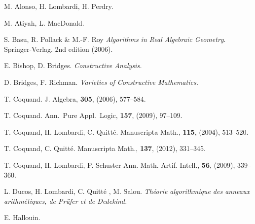 \documentclass[11pt,a4paper,twoside]{article}
\begin{document}
\begin{thebibliography}{50}

{\sc M. Alonso, H. Lombardi, H. Perdry}.

{\sc M. Atiyah, L. MacDonald}.

{\sc S. Basu, R. Pollack \& M.-F. Roy }{\em Algorithms in Real Algebraic Geometry}. Springer-Verlag.  2nd edition  (2006).


 {\sc E. {Bishop}, D. {Bridges}}.  
\newblock
{\em 
Constructive Analysis.  }

 {\sc D. {Bridges}, F. {Richman}}.	
\newblock
{\em   Varieties of Constructive Mathematics.}

 {\sc T. Coquand}. 
\newblock J. Algebra, {\bf 305}, (2006), 577--584.

 {\sc T. Coquand}.  %
\newblock Ann.~Pure Appl.~Logic, {\bf 157}, (2009), 97--109.

 {\sc T. Coquand, H. Lombardi, C. Quitt\'e}. 
\newblock Manuscripta Math., {\bf 115}, (2004), 513--520.

 {\sc T. Coquand, C. Quitt\'e}. 
\newblock Manuscripta Math., {\bf 137}, (2012), 331--345.



 {\sc T. Coquand, H. Lombardi, P. Schuster} 
\newblock Ann. Math. Artif. Intell., {\bf 56}, (2009), 339--360.


{\sc L. Ducos, H. Lombardi, C. Quitt\'e , M. Salou}.
\newblock
{\em Th\'eorie algorithmique des anneaux arithm\'etiques, de Pr\"ufer et de 
Dedekind.}


{\sc E. Hallouin}.


\end{thebibliography}
\end{document}
